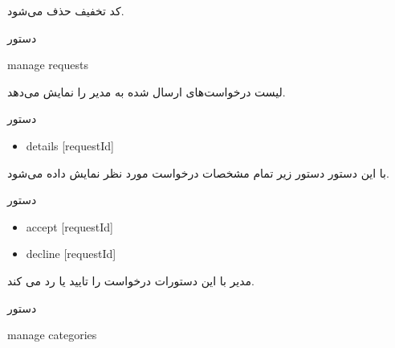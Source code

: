 \documentclass[]{article}
\begin{document}
کد تخفیف حذف می‌شود.


\hrulefill


\begin{mybox}[colback=yellow]{دستور}

\begin{latin}

manage requests

\end{latin}

\end{mybox}

لیست درخواست‌های ارسال شده به مدیر را نمایش می‌دهد.



\begin{mybox}[colback=brilliantlavender]{دستور}

\begin{latin}

\begin{itemize}[label = {$\Rightarrow$}]

\item
details [requestId]

\end{itemize}

\end{latin}

\end{mybox}

با این دستور دستور زیر تمام مشخصات درخواست مورد نظر نمایش داده می‌شود.


\begin{mybox}[colback=brilliantlavender]{دستور}


\begin{latin}

\begin{itemize}[label = {$\Rightarrow$}]

\item
accept [requestId]

\item
decline [requestId]

\end{itemize}

\end{latin}

\end{mybox}

مدیر با این دستورات درخواست را تایید یا رد می کند.

\hrulefill

\newpage

\begin{mybox}[colback=yellow]{دستور}

\begin{latin}

manage categories

\end{latin}

\end{mybox}
\end{document}
